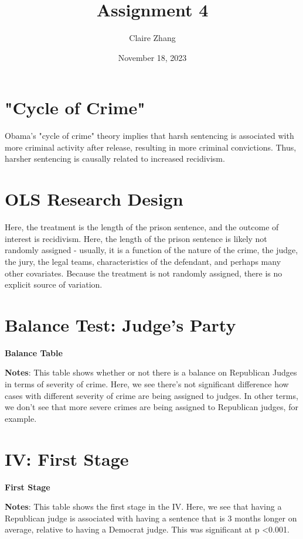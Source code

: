 \documentclass{article}
\title{Assignment 4}
\author{Claire Zhang}
\date{November 18, 2023}
\begin{document}
\maketitle

\section{"Cycle of Crime"}
Obama's "cycle of crime" theory implies that harsh sentencing is associated with more criminal activity after release, resulting in more criminal convictions. Thus, harsher sentencing is causally related to increased recidivism.

\section{OLS Research Design}
Here, the treatment is the length of the prison sentence, and the outcome of interest is recidivism. Here, the length of the prison sentence is likely not randomly assigned - usually, it is a function of the nature of the crime, the judge, the jury, the legal teams, characteristics of the defendant, and perhaps many other covariates. Because the treatment is not randomly assigned, there is no explicit source of variation.


\section{Balance Test: Judge's Party}
\begin{table}[htbp]
\caption{\textbf{Balance Table}
\label{tab:EngApproach}}
\center
	
    \center
    \begin{footnotesize}
    \textbf{Notes}: This table shows whether or not there is a balance on Republican Judges in terms of severity of crime. Here, we see there's not significant difference how cases with different severity of crime are being assigned to judges. In other terms, we don't see that more severe crimes are being assigned to Republican judges, for example.
    \end{footnotesize}
\end{table}

\newpage

\section{IV: First Stage}
\begin{table}[htbp]
\caption{\textbf{First Stage}
\label{tab:EngApproach}}
\center
	
    \center
    \begin{footnotesize}
    \textbf{Notes}: This table shows the first stage in the IV. Here, we see that having a Republican judge is associated with having a sentence that is 3 months longer on average, relative to having a Democrat judge. This was significant at p \textless 0.001.
    \end{footnotesize}
\end{table}
\end{document}
